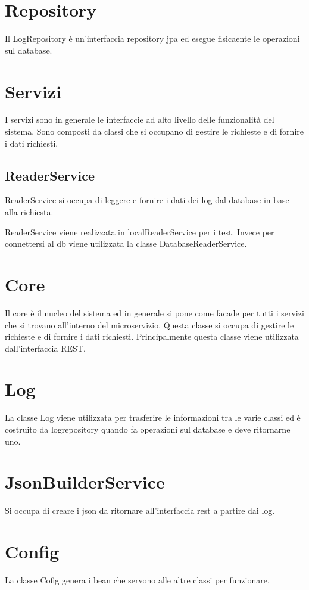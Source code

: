 \section{Repository}
Il LogRepository è un'interfaccia repository jpa ed esegue fisicaente le operazioni sul database.

\section{Servizi}

I servizi sono in generale le interfaccie ad alto livello delle funzionalità del sistema. Sono composti da classi che si occupano di gestire le richieste e di fornire i dati richiesti.

\subsection{ReaderService}
ReaderService si occupa di leggere e fornire i dati dei log dal database in base alla richiesta.

ReaderService viene realizzata in localReaderService per i test. Invece per connettersi al db viene utilizzata la classe DatabaseReaderService.

\section{Core}
Il core è il nucleo del sistema ed in generale si pone come facade per tutti i servizi che si trovano all'interno del microservizio. Questa classe si occupa di gestire le richieste e di fornire i dati richiesti.
Principalmente questa classe viene utilizzata dall'interfaccia REST.

\section{Log}
La classe Log viene utilizzata per trasferire le informazioni tra le varie classi ed è costruito da logrepository quando fa operazioni sul database e deve ritornarne uno.

\section{JsonBuilderService}
Si occupa di creare i json da ritornare all'interfaccia rest a partire dai log.

\section{ Config}
La classe Cofig genera i bean che servono alle altre classi per funzionare.



